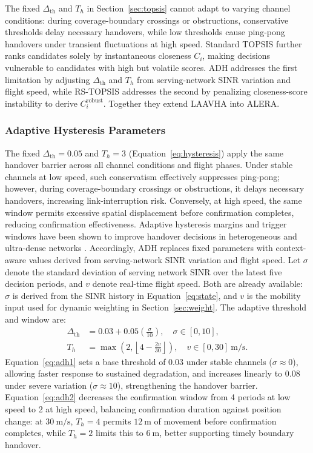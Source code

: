 \documentclass[preprint,12pt]{elsarticle}
\begin{document}
The fixed $\Delta_{\mathrm{th}}$ and $T_h$ in Section~\ref{sec:topsis} cannot adapt to varying channel conditions: during coverage-boundary crossings or obstructions, conservative thresholds delay necessary handovers, while low thresholds cause ping-pong handovers under transient fluctuations at high speed. Standard TOPSIS further ranks candidates solely by instantaneous closeness $C_i$, making decisions vulnerable to candidates with high but volatile scores. ADH addresses the first limitation by adjusting $\Delta_{\mathrm{th}}$ and $T_h$ from serving-network SINR variation and flight speed, while RS-TOPSIS addresses the second by penalizing closeness-score instability to derive $C_i^{\mathrm{robust}}$. Together they extend LAAVHA into ALERA.

\subsubsection{Adaptive Hysteresis Parameters}\label{sec:adh}

The fixed $\Delta_{\mathrm{th}}=0.05$ and $T_h=3$ (Equation~\eqref{eq:hysteresis}) apply the same handover barrier across all channel conditions and flight phases. Under stable channels at low speed, such conservatism effectively suppresses ping-pong; however, during coverage-boundary crossings or obstructions, it delays necessary handovers, increasing link-interruption risk. Conversely, at high speed, the same window permits excessive spatial displacement before confirmation completes, reducing confirmation effectiveness. Adaptive hysteresis margins and trigger windows have been shown to improve handover decisions in heterogeneous and ultra-dense networks \cite{ref28,ref29,ref30,ref31}. Accordingly, ADH replaces fixed parameters with context-aware values derived from serving-network SINR variation and flight speed. Let $\sigma$ denote the standard deviation of serving network SINR over the latest five decision periods, and $v$ denote real-time flight speed. Both are already available: $\sigma$ is derived from the SINR history in Equation~\eqref{eq:state}, and $v$ is the mobility input used for dynamic weighting in Section~\ref{sec:weight}. The adaptive threshold and window are:
\begin{align}
\Delta_{\mathrm{th}} &= 0.03+0.05\left(\frac{\sigma}{10}\right),\quad \sigma\in[0,10], \label{eq:adh1}\\
T_h &= \max\left(2,\left\lfloor4-\frac{2v}{30}\right\rfloor\right),\quad v\in[0,30]~\mathrm{m/s}. \label{eq:adh2}
\end{align}
Equation~\eqref{eq:adh1} sets a base threshold of 0.03 under stable channels ($\sigma\approx0$), allowing faster response to sustained degradation, and increases linearly to 0.08 under severe variation ($\sigma\approx10$), strengthening the handover barrier. Equation~\eqref{eq:adh2} decreases the confirmation window from 4 periods at low speed to 2 at high speed, balancing confirmation duration against position change: at $30~\mathrm{m/s}$, $T_h=4$ permits $12~\mathrm{m}$ of movement before confirmation completes, while $T_h=2$ limits this to $6~\mathrm{m}$, better supporting timely boundary handover.
\end{document}
